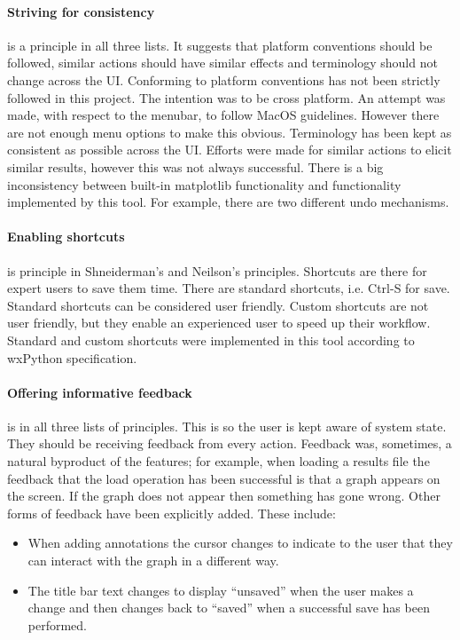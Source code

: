 \paragraph*{Striving for consistency} is a principle in all three lists.  It suggests that platform conventions should be followed, similar actions should have similar effects and terminology should not change across the \ac{UI}.  Conforming to platform conventions has not been strictly followed in this project.  The intention was to be cross platform.  An attempt was made, with respect to the menubar, to follow MacOS guidelines.  However there are not enough menu options to make this obvious.  Terminology has been kept as consistent as possible across the \ac{UI}.  Efforts were made for similar actions to elicit similar results, however this was not always successful.  There is a big inconsistency between built-in matplotlib functionality and functionality implemented by this tool.  For example, there are two different undo mechanisms.

\paragraph*{Enabling shortcuts} is principle in Shneiderman's and Neilson's principles.  Shortcuts are there for expert users to save them time.  There are standard shortcuts, i.e. Ctrl-S for save.  Standard shortcuts can be considered user friendly.  Custom shortcuts are not user friendly, but they enable an experienced user to speed up their workflow.  Standard and custom shortcuts were implemented in this tool according to wxPython specification.

\paragraph*{Offering informative feedback} is in all three lists of principles.  This is so the user is kept aware of system state.  They should be receiving feedback from every action. Feedback was, sometimes, a natural byproduct of the features; for example, when loading a results file the feedback that the load operation has been successful is that a graph appears on the screen. If the graph does not appear then something has gone wrong.  Other forms of feedback have been explicitly added.  These include:
\begin{itemize}
\item When adding annotations the cursor changes to indicate to the user that they can interact with the graph in a different way.
\item The title bar text changes to display ``unsaved'' when the user makes a change and then changes back to ``saved'' when a successful save has been performed.
\end{itemize}

